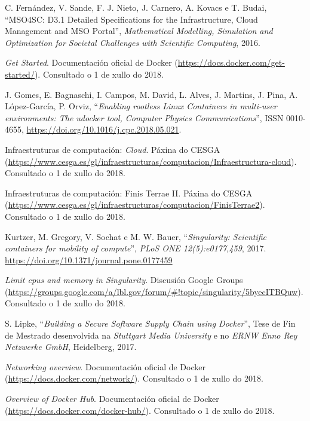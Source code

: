 \begin{thebibliography}{99}
 C. Fernández, V. Sande, F. J. Nieto, J. Carnero, A. Kovacs e T. Budai, ``MSO4SC: D3.1 Detailed Specifications for the Infrastructure, Cloud Management and MSO Portal'', \textit{Mathematical Modelling, Simulation and Optimization for Societal Challenges with Scientific Computing}, 2016.

 \textit{Get Started}. Documentación oficial de Docker (\url{https://docs.docker.com/get-started/}). Consultado o 1 de xullo do 2018.

 J. Gomes, E. Bagnaschi, I. Campos, M. David, L. Alves, J. Martins, J. Pina, A. López-García, P. Orviz, ``\textit{Enabling rootless Linux Containers in multi-user environments: The udocker tool, Computer Physics Communications}'', ISSN 0010-4655, \url{https://doi.org/10.1016/j.cpc.2018.05.021}.

 Infraestruturas de computación: \textit{Cloud}. Páxina do CESGA (\url{https://www.cesga.es/gl/infraestructuras/computacion/Infraestructura-cloud}). Consultado o 1 de xullo do 2018.

 Infraestruturas de computación: Finis Terrae II. Páxina do CESGA (\url{https://www.cesga.es/gl/infraestructuras/computacion/FinisTerrae2}). Consultado o 1 de xullo do 2018.

 Kurtzer, M. Gregory, V. Sochat e M. W. Bauer, ``\textit{Singularity: Scientific containers for mobility of compute}'', {\it PLoS ONE 12(5):e0177,459}, 2017. \url{https://doi.org/10.1371/journal.pone.0177459}

 \textit{Limit cpus and memory in Singularity}. Discusión Google Groups (\url{https://groups.google.com/a/lbl.gov/forum/\#!topic/singularity/5byecITBQuw}). Consultado o 1 de xullo do 2018.

 S. Lipke, ``\textit{Building a Secure Software Supply Chain using Docker}'', Tese de Fin de Mestrado desenvolvida na \textit{Stuttgart Media University} e no \textit{ERNW Enno Rey Netzwerke GmbH}, Heidelberg, 2017.

 \textit{Networking overview}. Documentación oficial de Docker (\url{https://docs.docker.com/network/}). Consultado o 1 de xullo do 2018.

 \textit{Overview of Docker Hub}. Documentación oficial de Docker (\url{https://docs.docker.com/docker-hub/}). Consultado o 1 de xullo do 2018.


\end{thebibliography}

